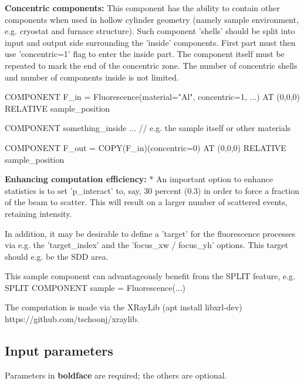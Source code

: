 \textbf{Concentric components:} This component has the ability to contain other components when used in hollow cylinder geometry (namely sample environment, e.g. cryostat and furnace structure). Such component 'shells' should be split into input and output side surrounding the 'inside' components. First part must then use 'concentric=1' flag to enter the inside part. The component itself must be repeated to mark the end of the concentric zone. The number of concentric shells and number of components inside is not limited.

COMPONENT F\_in = Fluorescence(material="Al", concentric=1, ...) AT (0,0,0) RELATIVE sample\_position

COMPONENT something\_inside ... // e.g. the sample itself or other materials

COMPONENT F\_out = COPY(F\_in)(concentric=0) AT (0,0,0) RELATIVE sample\_position

\textbf{Enhancing computation efficiency:} * An important option to enhance statistics is to set 'p\_interact' to, say, 30 percent (0.3) in order to force a fraction of the beam to scatter. This will result on a larger number of scattered events, retaining intensity.

In addition, it may be desirable to define a 'target' for the fluorescence processes via e.g. the 'target\_index' and the 'focus\_xw / focus\_yh' options. This target should e.g. be the SDD area.

This sample component can advantageously benefit from the SPLIT feature, e.g. SPLIT COMPONENT sample = Fluorescence(...)

The computation is made via the XRayLib (apt install libxrl-dev) https://github.com/tschoonj/xraylib.

\subsection*{Input parameters}
Parameters in \textbf{boldface} are required; the others are optional.

